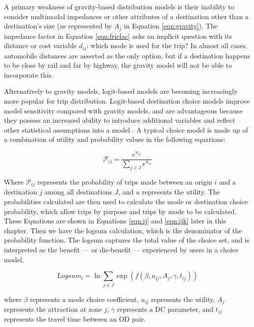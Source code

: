A primary weakness of gravity-based distribution models is their inability to
consider multimodal impedances or other attributes of a destination other than
a destination's size (as represented by $A_j$ in Equation \ref{eqn:gravity}). The
impedance factor in Equation \ref{eqn:fricfac} asks an implicit question with its
distance or cost variable $d_{ij}$: which mode is used for the trip? In almost
all cases, automobile distances are asserted as the only option, but if a
destination happens to be close by rail and far by highway, the gravity model
will not be able to incorporate this.

Alternatively to gravity models, logit-based models are becoming
increasingly more popular for trip distribution. Logit-based destination choice models improve model
sensitivity compared with gravity models, and are advantageous because
they possess an increased ability to introduce additional variables and reflect
other statistical assumptions into a model \citep{tfr2021}. A typical choice
model is made up of a combination of utility and probability values in the
following equations:

\begin{equation}
\mathcal{P}_{ij} = \frac{e^{u_{ij}}}{\sum_{j\in J}e^{u_{ij}}}
  \label{eqn:probability}
\end{equation}

\noindent Where $\mathcal{P}_{ij}$ represents the probability of trips made between an
origin \(i\) and a destination \(j\) among all destinations $J$, and \(u\) represents the utility. The probabilities
calculated are then used to calculate the mode or destination choice probability,
which allow trips by purpose and trips by mode to be calculated. These Equations
are shown in Equations \ref{eqn:ij} and \ref{eqn:ijk} later in this chapter. Then
we have the logsum calculation, which is the denominator of the probability function.
The logsum captures the total value of the choice set, and is interpreted as the
benefit --- or dis-benefit --- experienced by users in a choice model.

\begin{equation}
 Logsum_{i} = \ln\sum_{j\in J}\exp(f(\beta, u_{ij}, A_j, \gamma, t_{ij}))
  \label{eqn:logsum}
\end{equation}

\noindent where $\beta$ represents a mode choice coefficient, $u_{ij}$ represents the utility,
$A_j$ represents the attraction at zone $j$, $\gamma$ represents
a DC parameter, and $t_{ij}$ represents the travel time between an OD pair.


